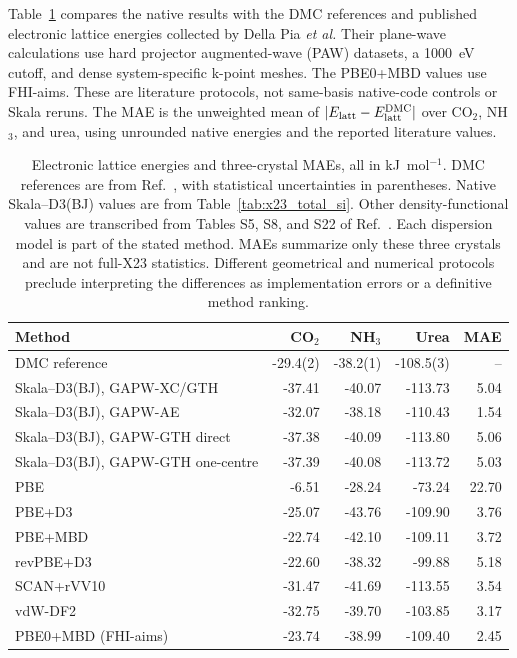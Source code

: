 Table~\ref{tab:x23-dft-context} compares the native results with the DMC references and published electronic lattice energies collected by Della Pia \emph{et al.}\cite{DellaPia2024X23,DellaPia2025MLIP} Their plane-wave calculations use hard projector augmented-wave (PAW) datasets, a 1000~eV cutoff, and dense system-specific k-point meshes. The PBE0+MBD values use FHI-aims. These are literature protocols, not same-basis native-code controls or Skala reruns. The MAE is the unweighted mean of $|E_{\rm latt}-E_{\rm latt}^{\rm DMC}|$ over CO$_2$, NH$_3$, and urea, using unrounded native energies and the reported literature values.

\begin{table}[htbp]
\centering
\small
\caption{Electronic lattice energies and three-crystal MAEs, all in kJ~mol$^{-1}$. DMC references are from Ref.~, with statistical uncertainties in parentheses. Native Skala--D3(BJ) values are from Table~\ref{tab:x23_total_si}. Other density-functional values are transcribed from Tables S5, S8, and S22 of Ref.~. Each dispersion model is part of the stated method. MAEs summarize only these three crystals and are not full-X23 statistics. Different geometrical and numerical protocols preclude interpreting the differences as implementation errors or a definitive method ranking.}
\label{tab:x23-dft-context}
\begin{tabular}{lrrrr}
\toprule
Method & CO$_2$ & NH$_3$ & Urea & MAE\\
\midrule
DMC reference & -29.4(2) & -38.2(1) & -108.5(3) & --\\
\midrule
Skala--D3(BJ), GAPW-XC/GTH & -37.41 & -40.07 & -113.73 & 5.04\\
Skala--D3(BJ), GAPW-AE & -32.07 & -38.18 & -110.43 & 1.54\\
Skala--D3(BJ), GAPW-GTH direct & -37.38 & -40.09 & -113.80 & 5.06\\
Skala--D3(BJ), GAPW-GTH one-centre & -37.39 & -40.08 & -113.72 & 5.03\\
\midrule
PBE & -6.51 & -28.24 & -73.24 & 22.70\\
PBE+D3 & -25.07 & -43.76 & -109.90 & 3.76\\
PBE+MBD & -22.74 & -42.10 & -109.11 & 3.72\\
revPBE+D3 & -22.60 & -38.32 & -99.88 & 5.18\\
SCAN+rVV10 & -31.47 & -41.69 & -113.55 & 3.54\\
vdW-DF2 & -32.75 & -39.70 & -103.85 & 3.17\\
PBE0+MBD (FHI-aims) & -23.74 & -38.99 & -109.40 & 2.45\\
\bottomrule
\end{tabular}
\end{table}

